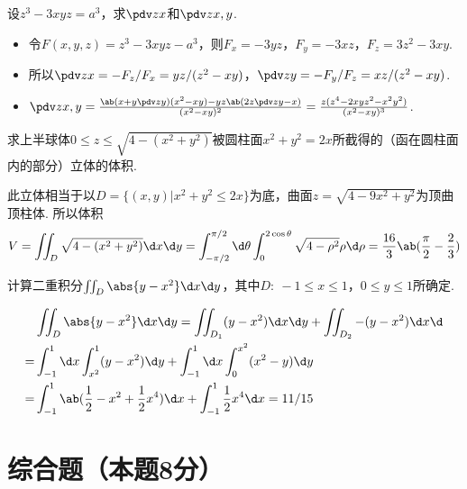 \begin{problem}
    设$z^3-3xyz=a^3$，求$\pdv zx$和$\pdv z{x,y}$.
\end{problem}
\begin{solution}\leavevmode
    \begin{itemize}
        \item 令$F(x,y,z)=z^3-3xyz-a^3$，则$F_x=-3yz$，$F_y=-3xz$，$F_z=3z^2-3xy$.
        \item 所以$\pdv zx=-F_z/F_x=yz/(z^2-xy)$，$\pdv zy=-F_y/F_z=xz/(z^2-xy)$.
        \item $\pdv z{x,y}=\frac{\ab(x+y\pdv zy)(x^2-xy)-yz\ab(2z\pdv zy-x)}{(x^2-xy)^2}=\frac{z(z^4-2xyz^2-x^2y^2)}{(x^2-xy)^3}$.
    \end{itemize}
\end{solution}

\begin{problem}
    求上半球体$0\leq z\leq\sqrt{4-(x^2+y^2)}$被圆柱面$x^2+y^2=2x$所截得的（函在圆柱面内的部分）立体的体积.
\end{problem}
\begin{solution}
    此立体相当于以$D=\{(x,y)|x^2+y^2\leq2x\}$为底，曲面$z=\sqrt{4-9x^2+y^2}$为顶曲顶柱体. 所以体积
    \[V=\iint_D\sqrt{4-(x^2+y^2)}\d x\d y=\int_{-\pi/2}^{\pi/2}\d\theta\int_0^{2\cos\theta}\sqrt{4-\rho^2}\rho\d\rho=\frac{16}{3}\ab(\frac\pi2-\frac23)\]
\end{solution}

\begin{problem}
    计算二重积分$\iint_D\abs{y-x^2}\d x\d y$，其中$D:\ -1\leq x\leq 1$，$0\leq y\leq1$所确定.
\end{problem}
\begin{solution}
    \[\begin{aligned}
        &\iint_D\abs{y-x^2}\d x\d y=\iint_{D_1}(y-x^2)\d x\d y+\iint_{D_2}-(y-x^2)\d x\d\\
        =&\int_{-1}^1\d x\int_{x^2}^1(y-x^2)\d y+\int_{-1}^1\d x\int_0^{x^2}(x^2-y)\d y\\
        =&\int_{-1}^1\ab(\frac12-x^2+\frac12x^4)\d x+\int_{-1}^1\frac12x^4\d x=11/15
    \end{aligned}\]
\end{solution}

\clearpage

\section{综合题（本题8分）}


